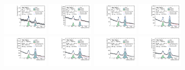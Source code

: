 \begin{figure}
    \centering
    \includegraphics[width=0.2\textwidth]{Figures/Chapter 5/inv_mass/pt_0.5_1.0.pdf}
    \includegraphics[width=0.2\textwidth]{Figures/Chapter 5/inv_mass/pt_1.0_1.5.pdf}
    \includegraphics[width=0.2\textwidth]{Figures/Chapter 5/inv_mass/pt_1.5_2.0.pdf}
    \includegraphics[width=0.2\textwidth]{Figures/Chapter 5/inv_mass/pt_2.0_2.5.pdf}
    \includegraphics[width=0.2\textwidth]{Figures/Chapter 5/inv_mass/pt_2.5_3.0.pdf}
    \includegraphics[width=0.2\textwidth]{Figures/Chapter 5/inv_mass/pt_3.0_3.5.pdf}
    \includegraphics[width=0.2\textwidth]{Figures/Chapter 5/inv_mass/pt_3.5_4.0.pdf}
    \includegraphics[width=0.2\textwidth]{Figures/Chapter 5/inv_mass/pt_4.0_4.5.pdf}

\end{figure}
